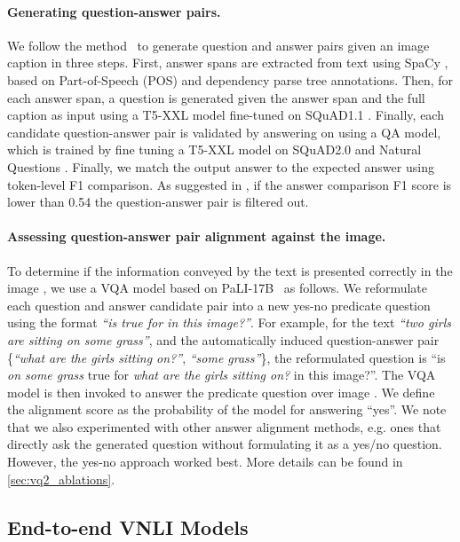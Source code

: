 \documentclass{article}
\begin{document}
\paragraph{Generating question-answer pairs.}

We follow the  method~\citep{changpinyo2022all} to generate question and answer pairs given an image caption in three steps. First, answer spans are extracted from text  using SpaCy \cite{spacy2}, based on Part-of-Speech (POS) and dependency parse tree annotations. Then, for each answer span, a question  is generated given the answer span and the full caption as input using a T5-XXL model fine-tuned on SQuAD1.1 \citep{rajpurkar-etal-2016-squad}. 
Finally, each candidate question-answer pair  is validated by answering  on  using a QA model, which is trained by fine tuning a T5-XXL model on SQuAD2.0 \citep{rajpurkar-etal-2018-know} and Natural Questions \citep{kwiatkowski-etal-2019-natural}. Finally, we match the output answer  to the expected answer  using token-level F1 comparison. As suggested in \cite{changpinyo2022all}, if the answer comparison F1 score is lower than 0.54 the question-answer pair is filtered out.

\paragraph{Assessing question-answer pair alignment against the image.}\label{ascessing_qa_alignment}
To determine if the information conveyed by the text  is presented correctly in the image , we use a VQA model based on PaLI-17B~\citep{pali2} as follows. We reformulate each question and answer candidate pair  into a new yes-no predicate question  using the format \textit{``is  true for  in this image?''}. For example, for the text \textit{``two girls are sitting on some grass''}, and the automatically induced question-answer pair \{\textit{``what are the girls sitting on?''}, \textit{``some grass''}\}, the reformulated question is ``is \textit{on some grass} true for \textit{what are the girls sitting on?} in this image?''.
The VQA model is then invoked to answer the predicate question  over image . We define the alignment score  as the probability of the model for answering ``yes''. We note that we also experimented with other answer alignment methods, e.g. ones that directly ask the generated question without formulating it as a yes/no question. However, the yes-no approach worked best. More details can be found in \cref{sec:vq2_ablations}.


\subsection{End-to-end VNLI Models}
\end{document}
